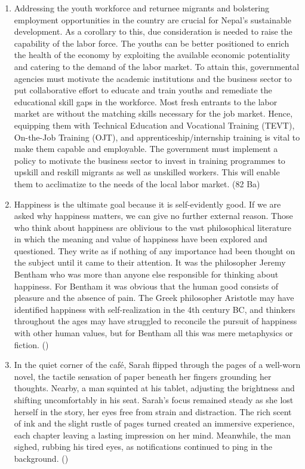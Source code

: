 \documentclass[12pt]{article}
\begin{document}
  \begin{enumerate}
    \item Addressing the youth workforce and returnee migrants and bolstering employment opportunities in the country are crucial for Nepal's sustainable development. As a corollary to this, due consideration is needed to raise the capability of the labor force. The youths can be better positioned to enrich the health of the economy by exploiting the available economic potentiality and catering to the demand of the labor market. To attain this, governmental agencies must motivate the academic institutions and the business sector to put collaborative effort to educate and train youths and remediate the educational skill gaps in the workforce. Most fresh entrants to the labor market are without the matching skills necessary for the job market. Hence, equipping them with Technical Education and Vocational Training (TEVT), On-the-Job Training (OJT), and apprenticeship/internship training is vital to make them capable and employable. The government must implement a policy to motivate the business sector to invest in training programmes to upskill and reskill migrants as well as unskilled workers. This will enable them to acclimatize to the needs of the local labor market. \hfill (82 Ba)

    \item Happiness is the ultimate goal because it is self-evidently good. If we are asked why happiness matters, we can give no further external reason. Those who think about happiness are oblivious to the vast philosophical literature in which the meaning and value of happiness have been explored and questioned. They write as if nothing of any importance had been thought on the subject until it came to their attention. It was the philosopher Jeremy Bentham who was more than anyone else responsible for thinking about happiness. For Bentham it was obvious that the human good consists of pleasure and the absence of pain. The Greek philosopher Aristotle may have identified happiness with self-realization in the 4th century BC, and thinkers throughout the ages may have struggled to reconcile the pursuit of happiness with other human values, but for Bentham all this was mere metaphysics or fiction. \hfill ()
    
    \item In the quiet corner of the café, Sarah flipped through the pages of a well-worn novel, the tactile sensation of paper beneath her fingers grounding her thoughts. Nearby, a man squinted at his tablet, adjusting the brightness and shifting uncomfortably in his seat. Sarah's focus remained steady as she lost herself in the story, her eyes free from strain and distraction. The rich scent of ink and the slight rustle of pages turned created an immersive experience, each chapter leaving a lasting impression on her mind. Meanwhile, the man sighed, rubbing his tired eyes, as notifications continued to ping in the background. \hfill ()


\end{enumerate}
\end{document}
